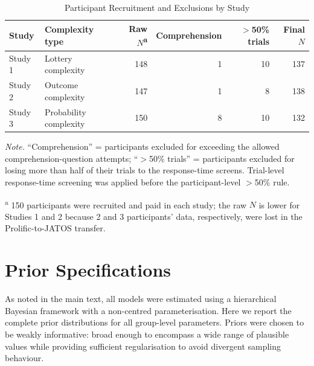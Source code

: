 \documentclass[man,floatsintext]{apa7}
\begin{document}
\begin{table}[!htbp]
\centering
\begin{threeparttable}
\caption{Participant Recruitment and Exclusions by Study}
\label{tab:exclusions}
\begin{tabular}{llrrrr}
\toprule
\textbf{Study} & \textbf{Complexity type} & \textbf{Raw $N$}\textsuperscript{a} & \textbf{Comprehension} & \textbf{$>$50\% trials} & \textbf{Final $N$} \\
\midrule
Study 1 & Lottery complexity     & 148 & 1 & 10 & 137 \\
Study 2 & Outcome complexity     & 147 & 1 & 8  & 138 \\
Study 3 & Probability complexity & 150 & 8 & 10 & 132 \\
\bottomrule
\end{tabular}
\begin{tablenotes}[flushleft]
\small
\item \textit{Note.} ``Comprehension'' = participants excluded for exceeding the allowed comprehension-question attempts; ``$>$50\% trials'' = participants excluded for losing more than half of their trials to the response-time screens. Trial-level response-time screening was applied before the participant-level $>$50\% rule.
\item \textsuperscript{a} 150 participants were recruited and paid in each study; the raw $N$ is lower for Studies 1 and 2 because 2 and 3 participants' data, respectively, were lost in the Prolific-to-JATOS transfer.
\end{tablenotes}
\end{threeparttable}
\end{table}

\section{Prior Specifications}
\label{sec:priors}

As noted in the main text, all models were estimated using a hierarchical Bayesian framework with a non-centred parameterisation. Here we report the complete prior distributions for all group-level parameters. Priors were chosen to be weakly informative: broad enough to encompass a wide range of plausible values while providing sufficient regularisation to avoid divergent sampling behaviour.
\end{document}
